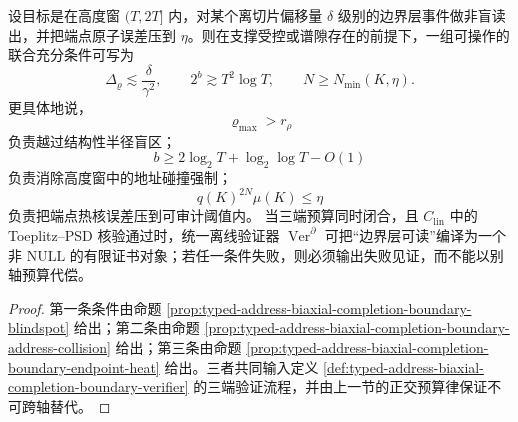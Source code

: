 \begin{theorem}[三端预算的最小联合充分条件]\label{thm:typed-address-biaxial-completion-boundary-joint-sufficiency}
设目标是在高度窗 \((T,2T]\) 内，对某个离切片偏移量 \(\delta\) 级别的边界层事件做非盲读出，并把端点原子误差压到 \(\eta\)。则在支撑受控或谱隙存在的前提下，一组可操作的联合充分条件可写为
\[
\Delta_{\varrho}\lesssim \frac{\delta}{\gamma^2},
\qquad
2^b\gtrsim T^2\log T,
\qquad
N\ge N_{\min}(K,\eta).
\]
更具体地说，
\[
\varrho_{\max}>r_{\rho}
\]
负责越过结构性半径盲区；
\[
b\ge 2\log_2 T+\log_2\log T-O(1)
\]
负责消除高度窗中的地址碰撞强制；
\[
q(K)^{2N}\mu(K)\le \eta
\]
负责把端点热核误差压到可审计阈值内。
当三端预算同时闭合，且 \(C_{\mathrm{lin}}\) 中的 Toeplitz--PSD 核验通过时，统一离线验证器 \(\operatorname{Ver}^{\partial}\) 可把“边界层可读”编译为一个非 \(\mathrm{NULL}\) 的有限证书对象；若任一条件失败，则必须输出失败见证，而不能以别轴预算代偿。
\end{theorem}
\begin{proof}
第一条条件由命题 \ref{prop:typed-address-biaxial-completion-boundary-blindspot} 给出；第二条由命题 \ref{prop:typed-address-biaxial-completion-boundary-address-collision} 给出；第三条由命题 \ref{prop:typed-address-biaxial-completion-boundary-endpoint-heat} 给出。三者共同输入定义 \ref{def:typed-address-biaxial-completion-boundary-verifier} 的三端验证流程，并由上一节的正交预算律保证不可跨轴替代。
\end{proof}

